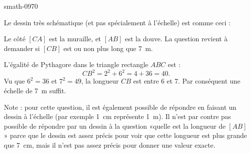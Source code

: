 
\begin{corrige}{smath-0970}

    Le dessin très schématique (et pas spécialement à l'échelle) est comme ceci :
\begin{center}
   
\end{center}
Le côté \( [CA]\) est la muraille, et \( [AB]\) est la douve. La question revient à demander si \( [CB]\) est ou non plus long que \SI{7}{\meter}.

L'égalité de Pythagore dans le triangle rectangle \( ABC\) est :
\begin{equation}
    CB^2=2^2+6^2=4+36=40.
\end{equation}
Vu que \( 6^2=36\) et \( 7^2=49\), la longueur \( CB\) est entre \( 6\) et \( 7\). Par conséquent une échelle de \SI{7}{\meter} suffit.


Note : pour cette question, il est également possible de répondre en faisant un dessin à l'échelle (par exemple \SI{1}{\centi\meter} représente \SI{1}{\meter}). Il n'est par contre pas possible de répondre par un dessin à la question «quelle est la longueur de \( [AB]\)» parce que le dessin est assez précis pour voir que cette longueur est plus grande que \SI{7}{\centi\meter}, mais il n'est pas assez précis pour donner une valeur exacte.

\end{corrige}
